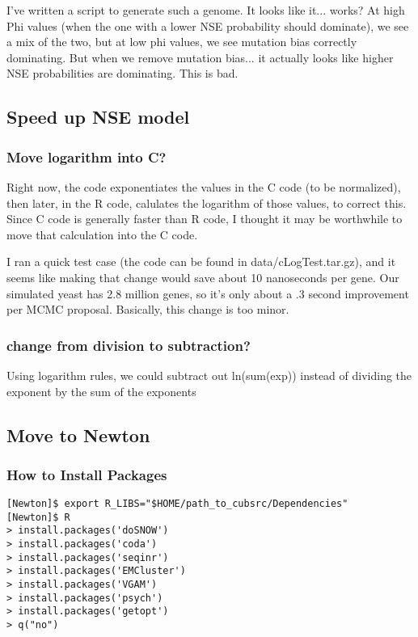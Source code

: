 I've written a script to generate such a genome. It looks like it... works? At high Phi values (when the one with a lower NSE probability should dominate), we see a mix of the two, but at low phi values, we see mutation bias correctly dominating. But when we remove mutation bias... it actually looks like higher NSE probabilities are dominating. This is bad.

\subsection{Speed up NSE model}

\subsubsection{Move logarithm into C?}

Right now, the code exponentiates the values in the C code (to be normalized), then later, in the R code, calulates the logarithm of those values, to correct this. Since C code is generally faster than R code, I thought it may be worthwhile to move that calculation into the C code.

I ran a quick test case (the code can be found in data/cLogTest.tar.gz), and it seems like making that change would save about 10 nanoseconds per gene. Our simulated yeast has 2.8 million genes, so it's only about a .3 second improvement per MCMC proposal. Basically, this change is too minor.

\subsubsection{change from division to subtraction?}

Using logarithm rules, we could subtract out ln(sum(exp)) instead of dividing the exponent by the sum of the exponents

\subsection{Move to Newton}

\subsubsection{How to Install Packages}

\begin{verbatim}
[Newton]$ export R_LIBS="$HOME/path_to_cubsrc/Dependencies"
[Newton]$ R
> install.packages('doSNOW')
> install.packages('coda')
> install.packages('seqinr')
> install.packages('EMCluster')
> install.packages('VGAM')
> install.packages('psych')
> install.packages('getopt')
> q("no")
\end{verbatim}

